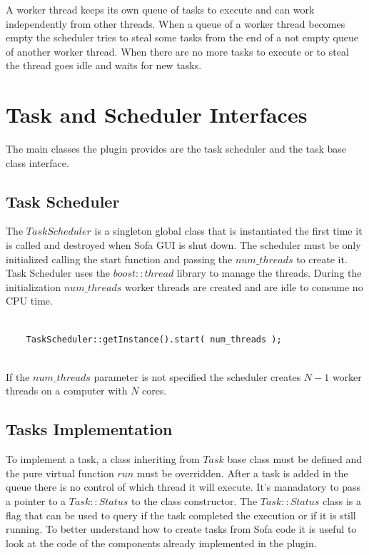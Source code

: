 \documentclass{article}
\begin{document}
A worker thread keeps its own queue of tasks to execute and can work independently from other threads.
When a queue of a worker thread becomes empty the scheduler tries to steal some tasks from the end of a not empty queue of another worker thread.
When there are no more tasks to execute or to steal the thread goes idle and waits for new tasks.



\section{Task and Scheduler Interfaces}

The main classes the plugin provides are the task scheduler and the task base class interface.

\subsection{Task Scheduler}

The $TaskScheduler$ is a singleton global class that is instantiated the first time it is called and destroyed when Sofa GUI is shut down.
The scheduler must be only initialized calling the start function and passing the $num\_threads$ to create it. 
Task Scheduler uses the $boost::thread$ library to manage the threads.
During the initialization $num\_threads$ worker threads are created and are idle to consume no CPU time.


\begin{lstlisting}

	TaskScheduler::getInstance().start( num_threads );
	
\end{lstlisting}

If the $num\_threads$ parameter is not specified the scheduler creates $N-1$ worker threads on a computer with $N$ cores. 


\subsection{Tasks Implementation}

To implement a task, a class inheriting from $Task$ base class must be defined and the pure virtual function $run$ must be overridden.
After a task is added in the queue there is no control of which thread it will execute.
It's manadatory to pass a pointer to a $Task::Status$ to the class constructor. 
The $Task::Status$ class is a flag that can be used to query if the task completed the execution or if it is still running.
To better understand how to create tasks from Sofa code it is useful to look at the code of the components already implemented in the plugin.
\end{document}
